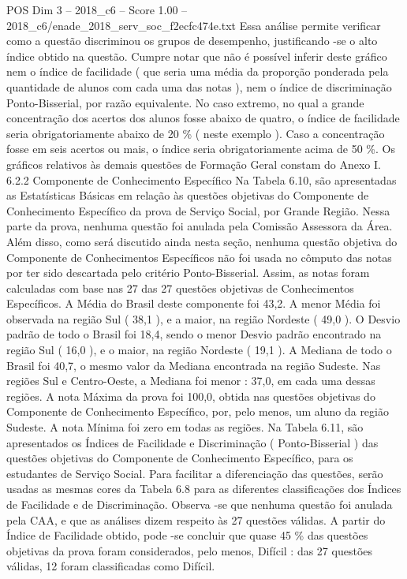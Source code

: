 \begin{textsample}{POS Dim 3 – 2018\_c6 – Score 1.00 – 2018\_c6/enade\_2018\_serv\_soc\_f2ecfc474e.txt}
Essa análise permite verificar como a questão discriminou os grupos de desempenho, justificando -se o alto índice obtido na questão.
Cumpre notar que não é possível inferir deste gráfico nem o índice de facilidade ( que seria uma média da proporção ponderada pela quantidade de alunos com cada uma das notas ), nem o índice de discriminação Ponto-Bisserial, por razão equivalente.
No caso extremo, no qual a grande concentração dos acertos dos alunos fosse abaixo de quatro, o índice de facilidade seria obrigatoriamente abaixo de 20 \% ( neste exemplo ).
Caso a concentração fosse em seis acertos ou mais, o índice seria obrigatoriamente acima de 50 \%.
Os gráficos relativos às demais questões de Formação Geral constam do Anexo I. 6.2.2 Componente de Conhecimento Específico Na Tabela 6.10, são apresentadas as Estatísticas Básicas em relação às questões objetivas do Componente de Conhecimento Específico da prova de Serviço Social, por Grande Região.
Nessa parte da prova, nenhuma questão foi anulada pela Comissão Assessora da Área.
Além disso, como será discutido ainda nesta seção, nenhuma questão objetiva do Componente de Conhecimentos Específicos não foi usada no cômputo das notas por ter sido descartada pelo critério Ponto-Bisserial.
Assim, as notas foram calculadas com base nas 27 das 27 questões objetivas de Conhecimentos Específicos.
A Média do Brasil deste componente foi 43,2.
A menor Média foi observada na região Sul ( 38,1 ), e a maior, na região Nordeste ( 49,0 ).
O Desvio padrão de todo o Brasil foi 18,4, sendo o menor Desvio padrão encontrado na região Sul ( 16,0 ), e o maior, na região Nordeste ( 19,1 ).
A Mediana de todo o Brasil foi 40,7, o mesmo valor da Mediana encontrada na região Sudeste.
Nas regiões Sul e Centro-Oeste, a Mediana foi menor : 37,0, em cada uma dessas regiões.
A nota Máxima da prova foi 100,0, obtida nas questões objetivas do Componente de Conhecimento Específico, por, pelo menos, um aluno da região Sudeste.
A nota Mínima foi zero em todas as regiões.
Na Tabela 6.11, são apresentados os Índices de Facilidade e Discriminação ( Ponto-Bisserial ) das questões objetivas do Componente de Conhecimento Específico, para os estudantes de Serviço Social.
Para facilitar a diferenciação das questões, serão usadas as mesmas cores da Tabela 6.8 para as diferentes classificações dos Índices de Facilidade e de Discriminação.
Observa -se que nenhuma questão foi anulada pela CAA, e que as análises dizem respeito às 27 questões válidas.
A partir do Índice de Facilidade obtido, pode -se concluir que quase 45 \% das questões objetivas da prova foram considerados, pelo menos, Difícil : das 27 questões válidas, 12 foram classificadas como Difícil.

\end{textsample}
